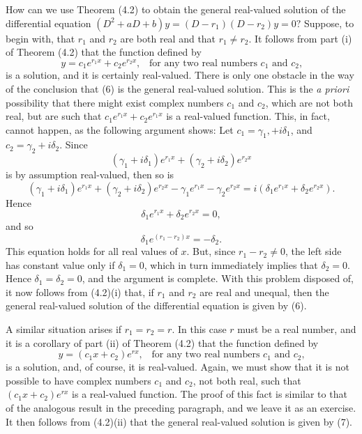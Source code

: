 \medskip
How can we use Theorem (4.2) to obtain the general real-valued solution of the differential equation $(D^2 + a D + b)y = (D - r_1)(D - r_2)y = 0?$ Suppose, to begin with, that $r_1$ and $r_2$ are both real and that $r_1 \neq r_2$. It follows from part (i) of Theorem (4.2) that the function defined by
\begin{equation}
y = c_1e^{r_1x} + c_2e^{r_2x}, \;\;\;\mbox{for any two real numbers $c_1$ and $c_2$,}
\label{eq11.4.6}
\end{equation}
is a solution, and it is certainly real-valued. There is only one obstacle in the way of the conclusion that (6) is the general real-valued solution. This is the 
\textit{a priori} possibility that there might exist complex numbers $c_1$ and $c_2$, which are not both real, but are such that $c_1e^{r_1x} + c_2e^{r_1x}$ is a real-valued function. This, in fact, cannot happen, as the following argument shows: Let $c_1 = \gamma_1, + i\delta_1$, and $c_2 = \gamma_2 + i\delta_2$. Since
$$
(\gamma_1 + i\delta_1)e^{r_1x} + (\gamma_2 + i\delta_2)e^{r_2x}
$$
is by assumption real-valued, then so is
$$
(\gamma_1 + i\delta_1)e^{r_1x} + (\gamma_2 + i\delta_2)e^{r_2x} - \gamma_1 e^{r_1x} - \gamma_2 e^{r_2x} = i(\delta_1 e^{r_1x} + \delta_2 e^{r_2x}).
$$
Hence 
$$
\delta_1e^{r_1x} + \delta_2e^{r_2x} = 0 ,
$$
and so
$$
\delta_1 e^{(r_1- r_2)x} = -\delta_2.
$$
This equation holds for all real values of $x$. But, since $r_1 - r_2 \neq 0$, the left side has constant value only if $\delta_1 = 0$, which in turn immediately implies that $\delta_2 = 0$. Hence $\delta_1 = \delta_2 = 0$, and the argument is complete. With this problem disposed of, it now follows from (4.2)(i) that, if $r_1$ and $r_2$ are real and unequal, then the general real-valued solution of the differential equation is given by (6).

A similar situation arises if $r_1 = r_2 = r$. In this case $r$ must be a real number, and it is a corollary of part (ii) of Theorem (4.2) that the function defined by
\begin{equation}
y = (c_1x + c_2)e^{rx}, \;\;\;\mbox{for any two real numbers $c_1$ and $c_2$,} 
\label{eq11.4.7}
\end{equation}
is a solution, and, of course, it is real-valued. Again, we must show that it is not possible to have complex numbers $c_1$ and $c_2$, not both real, such that $(c_1x + c_2)e^{rx}$ is a real-valued function. The proof of this fact is similar to that of the analogous result in the preceding paragraph, and we leave it as an
exercise. It then follows from (4.2)(ii) that the general real-valued solution is given by (7).

